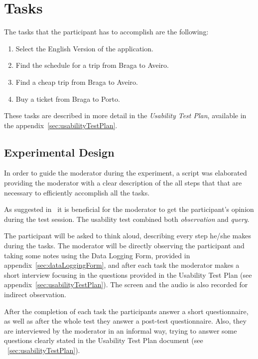 \documentclass[a4paper]{article}
\begin{document}
\section{Tasks}


The tasks that the participant has to accomplish are the following:

\begin{enumerate}
  \item Select the English Version of the application.
  \item Find the schedule for a trip from Braga to Aveiro.
  \item Find a cheap trip from Braga to Aveiro.
  \item Buy a ticket from Braga to Porto.
\end{enumerate}

These tasks are described in more detail in the \emph{Usability Test Plan}, available in the appendix~\ref{sec:usabilityTestPlan}.


\subsection{Experimental Design}

In order to guide the moderator during the experiment, a script was elaborated providing the moderator with a clear description of the all steps that that are necessary to efficiently accomplish all the tasks.


As suggested in~\citep{mitchell2007step} it is beneficial for the moderator to get the participant's opinion during the test session.
The usability test combined both \emph{observation} and \textit{query}.

 The participant will be asked to think aloud, describing every step he/she makes during the tasks. The moderator will be directly observing the participant and taking some notes using the Data Logging Form, provided in appendix~\ref{sec:dataLoggingForm}, and after each task the moderator makes a short interview focusing in the questions provided in the Usability Test Plan (see appendix~\ref{sec:usabilityTestPlan}). The screen and the audio is also recorded for indirect observation.

 After the completion of each task the participants answer a short questionnaire, as well as after the whole test they answer a post-test questionnaire. Also, they are interviewed by the moderator in an informal way, trying to answer some questions clearly stated in the Usability Test Plan document (see ~\ref{sec:usabilityTestPlan}). 
\end{document}
